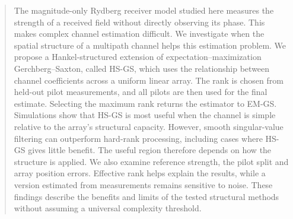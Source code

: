 \begin{abstract}
The magnitude-only Rydberg receiver model studied here measures the
strength of a received field without directly observing its phase. This
makes complex channel estimation difficult. We investigate when the
spatial structure of a multipath channel helps this estimation problem.
We propose a Hankel-structured extension of expectation--maximization
Gerchberg--Saxton, called HS-GS, which uses the relationship between channel
coefficients across a uniform linear array. The rank is chosen from
held-out pilot measurements, and all pilots are then used for the final
estimate. Selecting the maximum rank returns the estimator to EM-GS.
Simulations show that HS-GS is most useful when the channel is simple
relative to the array's structural capacity. However, smooth
singular-value filtering can outperform hard-rank processing, including
cases where HS-GS gives little benefit. The useful region therefore
depends on how the structure is applied. We also examine reference
strength, the pilot split and array position errors. Effective rank helps
explain the results, while a version estimated from measurements remains
sensitive to noise. These findings describe the benefits and limits of
the tested structural methods without assuming a universal complexity
threshold.
\end{abstract}
